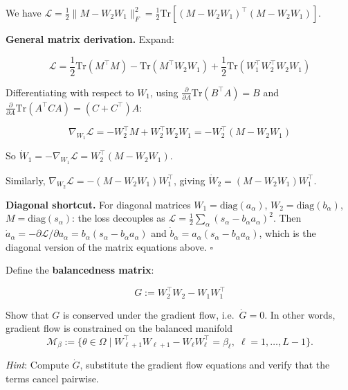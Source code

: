 \documentclass[11pt]{article}
\begin{document}
\begin{solution}[ex:td-2a]
We have
\(\mathcal{L} = \frac{1}{2}\|M - W_2 W_1\|_F^2 = \frac{1}{2}\text{Tr}\left[(M - W_2 W_1)^\top(M - W_2 W_1)\right]\).

\textbf{General matrix derivation.} Expand:

\[\mathcal{L} = \frac{1}{2}\text{Tr}(M^\top M) - \text{Tr}(M^\top W_2 W_1) + \frac{1}{2}\text{Tr}(W_1^\top W_2^\top W_2 W_1)\]

Differentiating with respect to \(W_1\), using
\(\frac{\partial}{\partial A}\text{Tr}(B^\top A) = B\) and
\(\frac{\partial}{\partial A}\text{Tr}(A^\top C A) = (C + C^\top)A\):

\[\nabla_{W_1}\mathcal{L} = -W_2^\top M + W_2^\top W_2 W_1 = -W_2^\top(M - W_2 W_1)\]

So \(\dot{W}_1 = -\nabla_{W_1}\mathcal{L} = W_2^\top(M - W_2 W_1)\).

Similarly, \(\nabla_{W_2}\mathcal{L} = -(M - W_2 W_1)W_1^\top\), giving
\(\dot{W}_2 = (M - W_2 W_1)W_1^\top\).

\textbf{Diagonal shortcut.} For diagonal matrices
\(W_1 = \text{diag}(a_\alpha)\), \(W_2 = \text{diag}(b_\alpha)\),
\(M = \text{diag}(s_\alpha)\): the loss decouples as
\(\mathcal{L} = \frac{1}{2}\sum_\alpha(s_\alpha - b_\alpha a_\alpha)^2\).
Then
\(\dot{a}_\alpha = -\partial\mathcal{L}/\partial a_\alpha = b_\alpha(s_\alpha - b_\alpha a_\alpha)\)
and \(\dot{b}_\alpha = a_\alpha(s_\alpha - b_\alpha a_\alpha)\), which
is the diagonal version of the matrix equations above. \(\square\)
\end{solution}

\begin{exercise}
\label{ex:td-2b}
Define the \textbf{balancedness matrix}:

\[G := W_2^\top W_2 - W_1 W_1^\top\]

Show that \(G\) is conserved under the gradient flow,
i.e.~\(\dot{G} = 0\). In other words, gradient flow is constrained on the balanced manifold \begin{equation*}
    \mathcal{M}_{\beta}
    :=
    \{\theta\in\Omega\mid
    W_{\ell+1}^{\top}W_{\ell+1}
    -
    W_{\ell}W_{\ell}^{\top}
    =
    \beta_\ell,\;
    \ell=1,\ldots,L-1\}.
\end{equation*}

\emph{Hint}: Compute
\(\dot{G}\),
substitute the gradient flow equations and verify that the
terms cancel pairwise.
\end{exercise}
\end{document}
